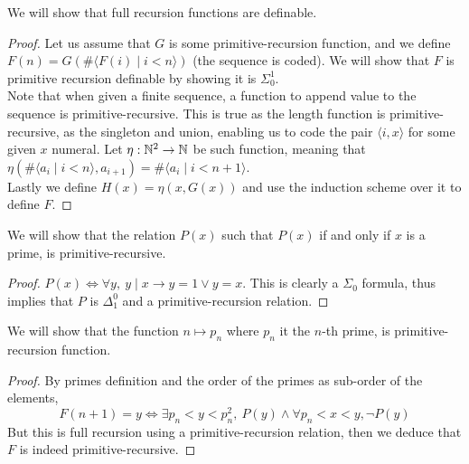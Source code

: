 \question[3]
\subquestion{}
We will show that full recursion functions are definable.
\begin{proof}
	Let us assume that $G$ is some primitive-recursion function, and we define $F(n) = G(\# \langle F(i) \mid i < n \rangle)$ (the sequence is coded).
	We will show that $F$ is primitive recursion definable by showing it is $\Sigma_0^1$. \\
	Note that when given a finite sequence, a function to append value to the sequence is primitive-recursive.
	This is true as the length function is primitive-recursive, as the singleton and union, enabling us to code the pair $\langle i, x \rangle$ for some given $x$ numeral.
	Let $\eta : \mathbb{N}^2 \to \mathbb{N}$ be such function, meaning that $\eta(\# \langle a_i \mid i < n \rangle, a_{i + 1}) = \#\langle a_i \mid i < n + 1 \rangle$. \\
	Lastly we define $H(x) = \eta(x, G(x))$ and use the induction scheme over it to define $F$.
\end{proof}

\subquestion{}
We will show that the relation $P(x)$ such that $P(x)$ if and only if $x$ is a prime, is primitive-recursive.
\begin{proof}
	$P(x) \iff \forall y,\ y \mid x \to y = 1 \lor y = x$.
	This is clearly a $\Sigma_0$ formula, thus implies that $P$ is $\Delta_1^0$ and a primitive-recursion relation.
\end{proof}

\subquestion{}
We will show that the function $n \mapsto p_n$ where $p_n$ it the $n$-th prime, is primitive-recursion function.
\begin{proof}
	By primes definition and the order of the primes as sub-order of the elements,
	\[
		F(n + 1) = y
		\iff \exists p_n < y < p_n^2,\ P(y) \land \forall p_n < x < y, \lnot P(y)
	\]
	But this is full recursion using a primitive-recursion relation, then we deduce that $F$ is indeed primitive-recursive.
\end{proof}

